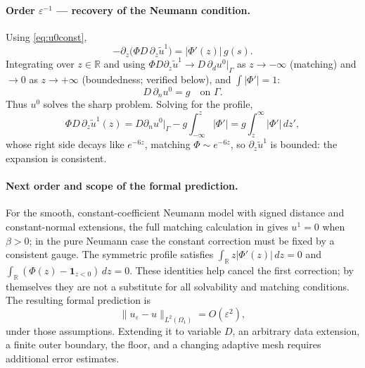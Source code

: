 \documentclass[11pt]{article}
\theoremstyle{remark}
\newcommand{\eps}{\varepsilon}
\begin{document}
\paragraph{Order $\eps^{-1}$ --- recovery of the Neumann condition.}
Using \eqref{eq:u0const},
\[
  -\partial_z\bigl(\Phi D\,\partial_z\tilde u^1\bigr)
  = |\Phi'(z)|\,g(s) .
\]
Integrating over $z\in\mathbb R$ and using
$\Phi D\partial_z\tilde u^1\to D\,\partial_d u^0|_\Gamma$ as
$z\to-\infty$ (matching) and $\to0$ as $z\to+\infty$ (boundedness;
verified below), and $\int|\Phi'|=1$:
\begin{equation}\label{eq:bc}
  D\,\partial_n u^0 = g \quad\text{on }\Gamma .
\end{equation}
Thus $u^0$ solves the sharp problem.  Solving for the profile,
\[
  \Phi D\,\partial_z\tilde u^1(z)
  = D\partial_n u^0\big|_\Gamma - g\!\int_{-\infty}^{z}\!|\Phi'|
  = g\!\int_{z}^{\infty}\!|\Phi'|\,dz' ,
\]
whose right side decays like $e^{-6z}$, matching $\Phi\sim e^{-6z}$, so
$\partial_z\tilde u^1$ is bounded: the expansion is consistent.

\paragraph{Next order and scope of the formal prediction.}
For the smooth, constant-coefficient Neumann model with signed distance
and constant-normal extensions, the full matching calculation in
\cite{LervagLowengrub} gives $u^1=0$ when $\beta>0$; in the pure
Neumann case the constant correction must be fixed by a consistent gauge.
The symmetric profile satisfies
$\int_{\mathbb R}z|\Phi'(z)|\,dz=0$ and
$\int_{\mathbb R}(\Phi(z)-\mathbf 1_{z<0})\,dz=0$.
These identities help cancel the first correction; by themselves they
are not a substitute for all solvability and matching conditions.
The resulting formal prediction is
\begin{equation}\label{eq:eps2}
  \|u_\eps-u\|_{L^2(\Omega_1)} = O(\eps^2),
\end{equation}
under those assumptions. Extending it to variable $D$, an arbitrary data
extension, a finite outer boundary, the floor, and a changing adaptive
mesh requires additional error estimates.
\end{document}
